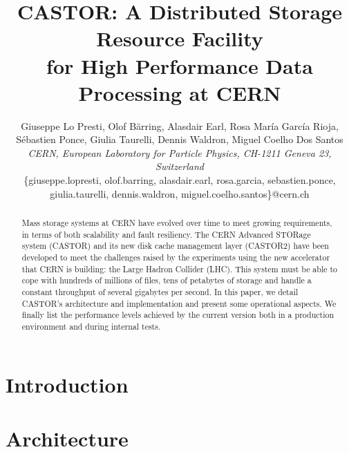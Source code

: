 \documentclass[10pt,twocolumn]{article}
\begin{document}
\title{CASTOR: A Distributed Storage Resource Facility \\
for High Performance Data Processing at CERN}

\author{
Giuseppe Lo Presti, Olof B\"{a}rring, Alasdair Earl, Rosa Mar\'ia Garc\'ia Rioja, \\
S\'ebastien Ponce, Giulia Taurelli, Dennis Waldron, Miguel Coelho Dos Santos \\
\textit{CERN, European Laboratory for Particle Physics, CH-1211 Geneva 23, Switzerland} \\
\{giuseppe.lopresti, olof.barring, alasdair.earl, rosa.garcia, sebastien.ponce, \\
giulia.taurelli, dennis.waldron, miguel.coelho.santos\}@cern.ch
}

\maketitle

\pagestyle{empty}
\thispagestyle{empty}

\begin{abstract}
Mass storage systems at CERN have evolved over time to meet growing requirements,
in terms of both scalability and fault resiliency.
The CERN Advanced STORage system (CASTOR) and its new disk cache management layer (CASTOR2)
have been developed to meet the challenges raised by the experiments using the new accelerator that CERN
is building: the Large Hadron Collider (LHC)\cite{LHC}.
This system must be able to cope with hundreds of millions of files, tens of petabytes
of storage and handle a constant throughput of several gigabytes per second.
In this paper, we detail CASTOR's architecture and implementation
and present some operational aspects. We finally list the performance levels achieved by the current version both
in a production environment and during internal tests.

\end{abstract}


\section{Introduction}

\label{s:intro}

\section{Architecture}
\label{s:arch}

\end{document}
